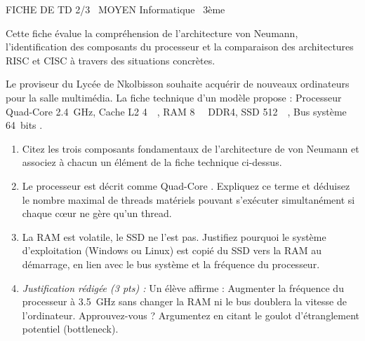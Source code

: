 \documentclass[11pt]{article}
\begin{document}
\begin{tcolorbox}[enhanced,colback=popink,colframe=popink,arc=10pt,boxrule=0pt,left=12pt,right=12pt,top=9pt,bottom=9pt]
{\color{white}\popxbold\small FICHE DE TD 2/3 \textbullet\ MOYEN \hfill Informatique \textbullet\ 3ème\par}
\end{tcolorbox}
\vspace{4pt}
\noindent Cette fiche évalue la compréhension de l'architecture von Neumann, l'identification des composants du processeur et la comparaison des architectures RISC et CISC à travers des situations concrètes.

\begin{exercice}
Le proviseur du Lycée de Nkolbisson souhaite acquérir de nouveaux ordinateurs pour la salle multimédia. La fiche technique d'un modèle propose : \og Processeur Quad-Core \SI{2.4}{\giga\hertz}, Cache L2 \SI{4}{\mebi\byte}, RAM \SI{8}{\gibi\byte} DDR4, SSD \SI{512}{\gibi\byte}, Bus système \SI{64}{bits} \fg.
\begin{enumerate}
    \item Citez les trois composants fondamentaux de l'architecture de von Neumann et associez à chacun un élément de la fiche technique ci-dessus.
    \item Le processeur est décrit comme \og Quad-Core \fg. Expliquez ce terme et déduisez le nombre maximal de threads matériels pouvant s'exécuter simultanément si chaque cœur ne gère qu'un thread.
    \item La RAM est volatile, le SSD ne l'est pas. Justifiez pourquoi le système d'exploitation (Windows ou Linux) est copié du SSD vers la RAM au démarrage, en lien avec le bus système et la fréquence du processeur.
    \item \textit{Justification rédigée (3 pts) :} Un élève affirme : \og Augmenter la fréquence du processeur à \SI{3.5}{\giga\hertz} sans changer la RAM ni le bus doublera la vitesse de l'ordinateur. \fg Approuvez-vous ? Argumentez en citant le goulot d'étranglement potentiel (bottleneck).
\end{enumerate}
\end{exercice}
\end{document}
